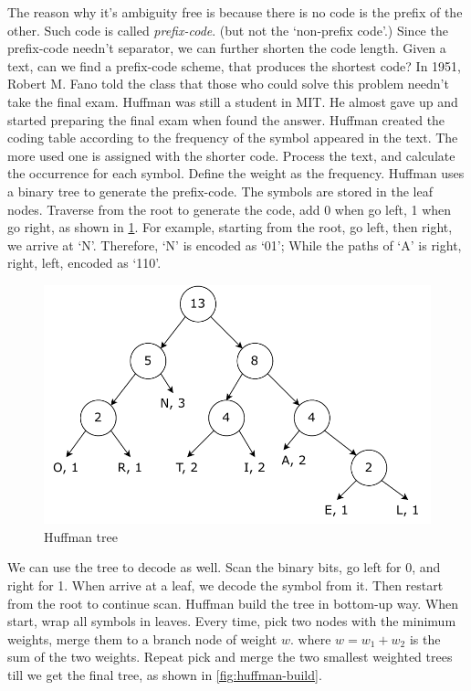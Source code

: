 \documentclass[b5paper]{article}
\begin{document}
The reason why it's ambiguity free is because there is no code is the prefix of the other. Such code is called {\em prefix-code}. (but not the `non-prefix code'.) Since the prefix-code needn't separator, we can further shorten the code length. Given a text, can we find a prefix-code scheme, that produces the shortest code? In 1951, Robert M. Fano told the class that those who could solve this problem needn't take the final exam. Huffman was still a student in MIT\cite{Huffman}. He almost gave up and started preparing the final exam when found the answer. Huffman created the coding table according to the frequency of the symbol appeared in the text. The more used one is assigned with the shorter code. Process the text, and calculate the occurrence for each symbol. Define the weight as the frequency. Huffman uses a binary tree to generate the prefix-code. The symbols are stored in the leaf nodes. Traverse from the root to generate the code, add 0 when go left, 1 when go right, as shown in \cref{fig:huffman-tr}. For example, starting from the root, go left, then right, we arrive at `N'. Therefore, `N' is encoded as `01'; While the paths of `A' is right, right, left, encoded as `110'.

\begin{figure}[htbp]
 \centering
 \includegraphics[scale=0.5]{img/huffman-tr}
 \caption{Huffman tree}
 \label{fig:huffman-tr}
\end{figure}

We can use the tree to decode as well. Scan the binary bits, go left for 0, and right for 1. When arrive at a leaf, we decode the symbol from it. Then restart from the root to continue scan. Huffman build the tree in bottom-up way. When start, wrap all symbols in leaves. Every time, pick two nodes with the minimum weights, merge them to a branch node of weight $w$. where $w = w_1 + w_2$ is the sum of the two weights. Repeat pick and merge the two smallest weighted trees till we get the final tree, as shown in \cref{fig:huffman-build}.
\end{document}
